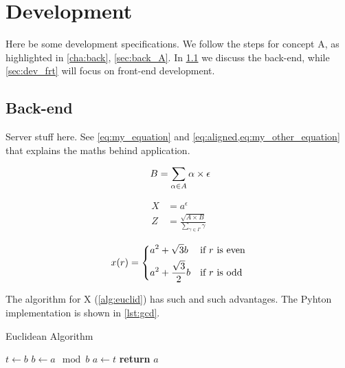 \chapter{Development}
\label{cha:dev}

Here be some development specifications. We follow the steps for concept A, as highlighted in \cref{cha:back}, \cref{sec:back_A}. In \cref{sec:dev_bck} we discuss the back-end, while \cref{sec:dev_frt} will focus on front-end development.

\section{Back-end}
\label{sec:dev_bck}

Server stuff here. See \cref{eq:my_equation} and \cref{eq:aligned,eq:my_other_equation} that explains the maths behind application.

\begin{equation}~\label{eq:my_equation}
    B = \sum_{\alpha \in A} \alpha \times \epsilon
\end{equation}

\begin{align}
	X & = a^{\epsilon} \nonumber \\
	Z & = \frac{\sqrt{A \times B}}{\sum_{\gamma \in \Gamma} \gamma} \label{eq:aligned}
\end{align}

\begin{equation}~\label{eq:my_other_equation}
    x(r) =
        \begin{dcases*}
		a^2 + \sqrt{3} b & if $r$ is even \\
		a^2 + \frac{\sqrt{3}}{2} b & if $r$ is odd
		\end{dcases*}
\end{equation}

The algorithm for X (\cref{alg:euclid}) has such and such advantages. The Pyhton implementation is shown in \cref{lst:gcd}.

\begin{algorithm}
\caption{Euclidean Algorithm}\label{alg:euclid}
\begin{algorithmic}[1]
    \State $t \gets b$
    \State $b \gets a \mod b$
    \State $a \gets t$
\EndWhile
\State \textbf{return} $a$
\EndFunction
\end{algorithmic}
\end{algorithm}

